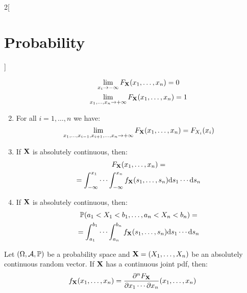 \documentclass[../../../main.tex]{subfiles}
\begin{document}
\begin{multicols}{2}[\section{Probability}]
\begin{prop}
\begin{enumerate}
\begin{gather*}
              \lim_{x_i\to-\infty}F_{\boldsymbol{\mathrm{X}}}(x_1,\ldots,x_n)=0\\
              \lim_{x_1,\ldots,x_n\to+\infty}F_{\boldsymbol{\mathrm{X}}}(x_1,\ldots,x_n)=1
            \end{gather*}
      \item For all $i=1,\ldots,n$ we have: $$\lim_{x_1,\ldots,x_{i-1},x_{i+1},\ldots,x_n\to+\infty}F_{\boldsymbol{\mathrm{X}}}(x_1,\ldots,x_n)=F_{X_i}(x_i)$$
      \item If $\boldsymbol{\mathrm{X}}$ is absolutely continuous, then:
            \begin{multline*}
              F_{\boldsymbol{\mathrm{X}}}(x_1,\ldots,x_n)=\\=\int_{-\infty}^{x_1}\cdots\int_{-\infty}^{x_n} f_{\boldsymbol{\mathrm{X}}}(s_1,\ldots,s_n)\dd s_1\cdots\dd s_n
            \end{multline*}
      \item If $\boldsymbol{\mathrm{X}}$ is absolutely continuous, then:
            \begin{multline*}
              \mathbb{P}(a_1<X_1<b_1,\ldots,a_n<X_n<b_n)=\\=\int_{a_1}^{b_1}\cdots\int_{a_n}^{b_n} f_{\boldsymbol{\mathrm{X}}}(s_1,\ldots,s_n)\dd s_1\cdots\dd s_n
            \end{multline*}
    \end{enumerate}
  \end{prop}
  \begin{prop}
    Let $(\Omega,\mathcal{A},\mathbb{P})$ be a probability space and $\boldsymbol{\mathrm{X}}=(X_1,\ldots,X_n)$ be an absolutely continuous random vector. If $\boldsymbol{\mathrm{X}}$ has a continuous joint pdf, then: $$f_{\boldsymbol{\mathrm{X}}}(x_1,\ldots,x_n)=\frac{\partial^nF_{\boldsymbol{\mathrm{X}}}}{\partial x_1\cdots\partial x_n}(x_1,\ldots,x_n)$$
  \end{prop}

\end{multicols}
\end{document}
